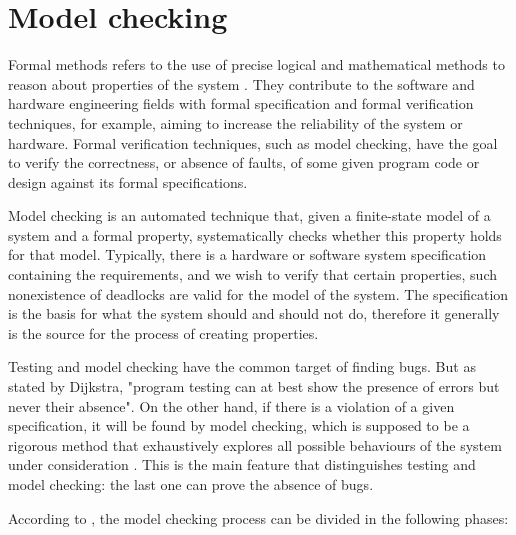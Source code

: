 \section{Model checking}
\label{sec-modelcheck}

Formal methods refers to the use of precise logical and mathematical methods to reason about properties of the system \cite{Eriksson}. They contribute to the software and hardware engineering fields with formal specification and formal verification techniques, for example, aiming to increase the reliability of the system or hardware. Formal verification techniques, such as model checking, have the goal to verify the correctness, or absence of faults, of some given program code or design against its formal specifications\cite{Tian}.

Model checking is an automated technique that, given a finite-state model of a system and a formal property, systematically checks whether this property holds for that model\cite{Baier}. Typically, there is a hardware or software system specification containing the requirements, and we wish to verify that certain properties, such nonexistence of deadlocks are valid for the model of the system. The specification is the basis for what the system should and should not do, therefore it generally is the source for the process of creating properties.

Testing and model checking have the common target of finding bugs. But as stated by Dijkstra, "program testing can at best show the presence of errors but never their absence". On the other hand, if there is a violation of a given specification, it will be found by model checking, which is supposed to be a rigorous method that exhaustively explores all possible behaviours of the system under consideration \cite{testVsModelCheck}. This is the main feature that distinguishes testing and model checking: the last one can prove the absence of bugs\cite{patrice}.

According to \cite{Baier}, the model checking process can be divided in the following phases:

